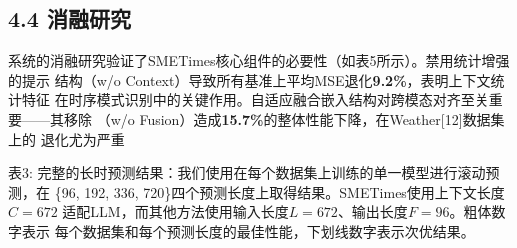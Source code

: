 \documentclass[
  10
]{article}
\begin{document}
\subsection{4.4 消融研究}\label{ablation-studies}

系统的消融研究验证了SMETimes核心组件的必要性（如表5所示）。禁用统计增强的提示
结构（w/o Context）导致所有基准上平均MSE退化\textbf{9.2\%}，表明上下文统计特征
在时序模式识别中的关键作用。自适应融合嵌入结构对跨模态对齐至关重要——其移除
（w/o Fusion）造成\textbf{15.7\%}的整体性能下降，在Weather{[}12{]}数据集上的
退化尤为严重

表3: 完整的长时预测结果：我们使用在每个数据集上训练的单一模型进行滚动预测，在
\{96, 192, 336, 720\}四个预测长度上取得结果。SMETimes使用上下文长度\(C = 672\)
适配LLM，而其他方法使用输入长度\(L = 672\)、输出长度\(F = 96\)。粗体数字表示
每个数据集和每个预测长度的最佳性能，下划线数字表示次优结果。
\end{document}
